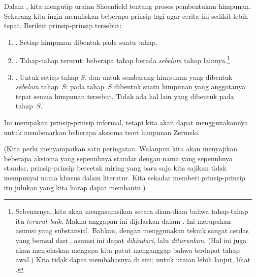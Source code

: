 \documentclass[../../../include/open-logic-section]{subfiles}
\begin{document}
	
Dalam , kita mengutip uraian Shoenfield tentang
proses pembentukan himpunan. Sekarang kita ingin menuliskan beberapa prinsip
lagi agar cerita ini sedikit lebih tepat. Berikut prinsip-prinsip tersebut:
\begin{enumerate}
\item[] \stageshier. Setiap himpunan dibentuk pada suatu tahap.
\item[] \stagesord. Tahap-tahap terurut: beberapa tahap berada
\emph{sebelum} tahap lainnya.\footnote{Sebenarnya, kita akan mengasumsikan
secara diam-diam bahwa tahap-tahap itu \emph{terurut baik}. Makna anggapan ini
dijelaskan dalam . Ini merupakan asumsi yang
substansial. Bahkan, dengan menggunakan teknik sangat cerdas yang berasal
dari \citet{Scott1974}, asumsi ini dapat \emph{dihindari}, lalu
\emph{diturunkan}. (Hal ini juga akan menjelaskan mengapa kita patut
menganggap bahwa terdapat tahap awal.) Kita tidak dapat membahasnya di sini;
untuk uraian lebih lanjut, lihat \citet{ButtonLT1}.}
\item[] \stagesacc. Untuk setiap tahap $S$, dan untuk sembarang himpunan yang
dibentuk \emph{sebelum} tahap~$S$: pada tahap~$S$ dibentuk suatu himpunan yang
anggotanya tepat semua himpunan tersebut. Tidak ada hal lain yang dibentuk
pada tahap~$S$.
\end{enumerate}
Ini merupakan prinsip-prinsip informal, tetapi kita akan dapat menggunakannya
untuk membenarkan beberapa aksioma teori himpunan Zermelo.

(Kita perlu menyampaikan satu peringatan. Walaupun kita akan menyajikan
beberapa aksioma yang sepenuhnya standar dengan nama yang sepenuhnya standar,
prinsip-prinsip bercetak miring yang baru saja kita sajikan tidak mempunyai
nama khusus dalam literatur. Kita sekadar memberi prinsip-prinsip itu julukan
yang kita harap dapat membantu.)
\end{document}
